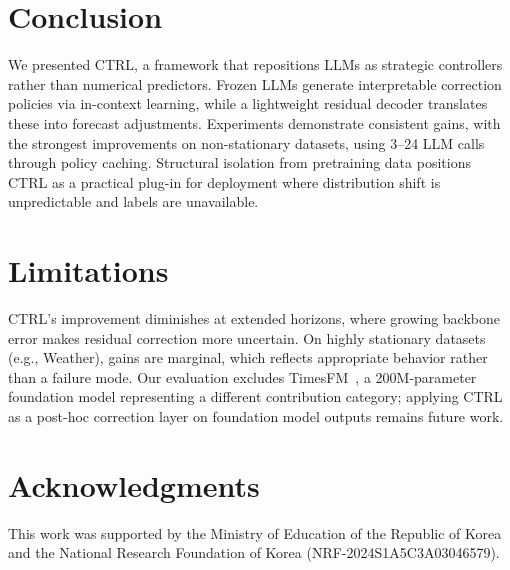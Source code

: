 \section{Conclusion}
\label{sec:conclusion}

We presented CTRL, a framework that repositions LLMs as strategic controllers rather than numerical predictors. Frozen LLMs generate interpretable correction policies via in-context learning, while a lightweight residual decoder translates these into forecast adjustments. Experiments demonstrate consistent gains, with the strongest improvements on non-stationary datasets, using 3--24 LLM calls through policy caching. Structural isolation from pretraining data positions CTRL as a practical plug-in for deployment where distribution shift is unpredictable and labels are unavailable.

\section{Limitations}
CTRL's improvement diminishes at extended horizons, where growing backbone error makes residual correction more uncertain. On highly stationary datasets (e.g., Weather), gains are marginal, which reflects appropriate behavior rather than a failure mode. Our evaluation excludes TimesFM~\cite{das2024timesfm}, a 200M-parameter foundation model representing a different contribution category; applying CTRL as a post-hoc correction layer on foundation model outputs remains future work.


\section*{Acknowledgments}

This work was supported by the Ministry of Education of the Republic of Korea and the National Research Foundation of Korea (NRF-2024S1A5C3A03046579).
